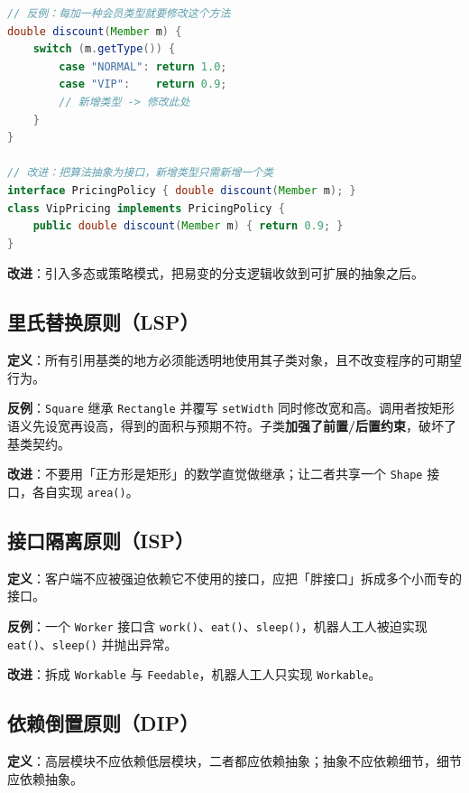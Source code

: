 \begin{lstlisting}[language=Java, caption={OCP 反例与改进}, captionpos=b]
// 反例：每加一种会员类型就要修改这个方法
double discount(Member m) {
    switch (m.getType()) {
        case "NORMAL": return 1.0;
        case "VIP":    return 0.9;
        // 新增类型 -> 修改此处
    }
}

// 改进：把算法抽象为接口，新增类型只需新增一个类
interface PricingPolicy { double discount(Member m); }
class VipPricing implements PricingPolicy {
    public double discount(Member m) { return 0.9; }
}
\end{lstlisting}

\textbf{改进}：引入多态或策略模式，把易变的分支逻辑收敛到可扩展的抽象之后。

\subsection{里氏替换原则（LSP）}

\textbf{定义}：所有引用基类的地方必须能透明地使用其子类对象，且不改变程序的可期望行为。

\textbf{反例}：\texttt{Square} 继承 \texttt{Rectangle} 并覆写 \texttt{setWidth} 同时修改宽和高。调用者按矩形语义先设宽再设高，得到的面积与预期不符。子类\textbf{加强了前置/后置约束}，破坏了基类契约。

\textbf{改进}：不要用「正方形是矩形」的数学直觉做继承；让二者共享一个 \texttt{Shape} 接口，各自实现 \texttt{area()}。

\subsection{接口隔离原则（ISP）}

\textbf{定义}：客户端不应被强迫依赖它不使用的接口，应把「胖接口」拆成多个小而专的接口。

\textbf{反例}：一个 \texttt{Worker} 接口含 \texttt{work()}、\texttt{eat()}、\texttt{sleep()}，机器人工人被迫实现 \texttt{eat()}、\texttt{sleep()} 并抛出异常。

\textbf{改进}：拆成 \texttt{Workable} 与 \texttt{Feedable}，机器人工人只实现 \texttt{Workable}。

\subsection{依赖倒置原则（DIP）}

\textbf{定义}：高层模块不应依赖低层模块，二者都应依赖抽象；抽象不应依赖细节，细节应依赖抽象。

